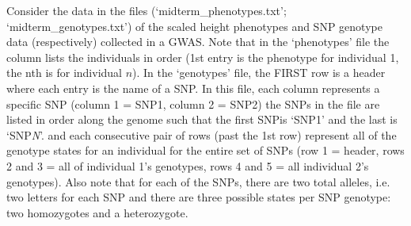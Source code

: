 \documentclass[letterpaper, 11pt]{article}
\begin{document}
\pagebreak

Consider the data in the files (`midterm\_phenotypes.txt'; `midterm\_genotypes.txt') of the scaled height phenotypes and SNP genotype data (respectively) collected in a GWAS.  Note that in the `phenotypes' file the column lists the individuals in order (1st entry is the phenotype for individual 1, the nth is for individual $n$).  In the `genotypes' file, the FIRST row is a header where each entry is the name of a SNP.  In this file, each column represents a specific SNP (column 1 = SNP1, column 2 = SNP2) the SNPs in the file are listed in order along the genome such that the first SNPis `SNP1' and the last is `SNP\textit{N}'. and each consecutive pair of rows (past the 1st row) represent all of the genotype states for an individual for the entire set of SNPs (row 1 = header, rows 2 and 3 = all of individual 1's genotypes, rows 4 and 5 = all individual 2's genotypes).  Also note that for each of the SNPs, there are two total alleles, i.e. two letters for each SNP and there are three possible states per SNP genotype: two homozygotes and a heterozygote.  
\end{document}
